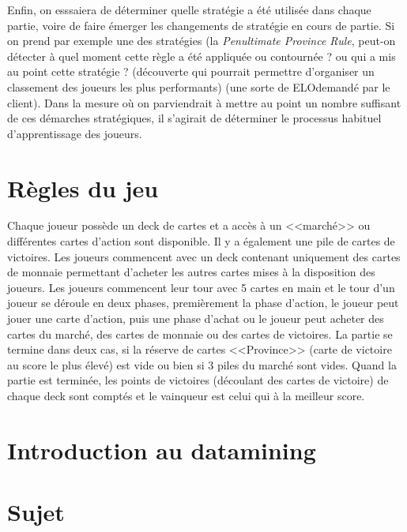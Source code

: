 Enfin, on esssaiera de déterminer quelle stratégie a été utilisée dans chaque partie, voire de faire émerger les changements de stratégie en cours de partie. Si on prend par exemple une des stratégies (la \textit{Penultimate Province Rule}, peut-on détecter à quel moment cette règle a été appliquée ou contournée ? ou qui a mis au point cette stratégie ? (découverte qui pourrait permettre d'organiser un classement des joueurs les plus performants) (une sorte de ELO\footnotemark demandé par le client). Dans la mesure où on parviendrait à mettre au point un nombre suffisant de ces démarches stratégiques, il s'agirait de déterminer le processus habituel d'apprentissage des joueurs.


\section{Règles du jeu}
Chaque joueur possède un deck de cartes et a accès à un <<marché>> ou différentes cartes d'action sont disponible. Il y a également une pile de cartes de victoires.
\newline Les joueurs commencent avec un deck contenant uniquement des cartes de monnaie permettant d'acheter les autres cartes mises à la disposition des joueurs. Les joueurs commencent leur tour avec 5 cartes en main et le tour d'un joueur se déroule en deux phases, premièrement la phase d'action, le joueur peut jouer une carte d'action, puis une phase d'achat ou le joueur peut acheter des cartes du marché, des cartes de monnaie ou des cartes de victoires.
\newline La partie se termine dans deux cas, si la réserve de cartes <<Province>> (carte de victoire au score le plus élevé) est vide ou bien si 3 piles du marché sont vides. Quand la partie est terminée, les points de victoires (découlant des cartes de victoire) de chaque deck sont comptés et le vainqueur est celui qui à la meilleur score.

\section{Introduction au datamining}


\section{Sujet}

